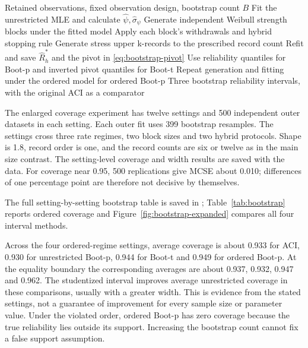 \begin{algorithm}[htbp]
\caption{Parametric bootstrap intervals for one retained dataset}\label{alg:bootstrap}
\begin{algorithmic}[1]
\REQUIRE Retained observations, fixed observation design, bootstrap count $B$
\STATE Fit the unrestricted MLE and calculate $\widehat\psi,\widehat\sigma_\psi$
\STATE Generate independent Weibull strength blocks under the fitted model
\STATE Apply each block's withdrawals and hybrid stopping rule
\STATE Generate stress upper k-records to the prescribed record count
\STATE Refit and save $\widehat R_h^*$ and the pivot in \eqref{eq:bootstrap-pivot}
\ENDFOR
\STATE Use reliability quantiles for Boot-p and inverted pivot quantiles for Boot-t
\STATE Repeat generation and fitting under the ordered model for ordered Boot-p
\ENSURE Three bootstrap reliability intervals, with the original ACI as a comparator
\end{algorithmic}
\end{algorithm}

The enlarged coverage experiment has twelve settings and 500 independent outer datasets in each setting. Each outer fit uses 399 bootstrap resamples. The settings cross three rate regimes, two block sizes and two hybrid protocols. Shape is 1.8, record order is one, and the record counts are six or twelve as in the main size contrast. The setting-level coverage and width results are saved with the data. For coverage near 0.95, 500 replications give MCSE about 0.010; differences of one percentage point are therefore not decisive by themselves.

The full setting-by-setting bootstrap table is saved in ; Table~\ref{tab:bootstrap} reports ordered coverage and Figure~\ref{fig:bootstrap-expanded} compares all four interval methods.

Across the four ordered-regime settings, average coverage is about 0.933 for ACI, 0.930 for unrestricted Boot-p, 0.944 for Boot-t and 0.949 for ordered Boot-p. At the equality boundary the corresponding averages are about 0.937, 0.932, 0.947 and 0.962. The studentized interval improves average unrestricted coverage in these comparisons, usually with a greater width. This is evidence from the stated settings, not a guarantee of improvement for every sample size or parameter value. Under the violated order, ordered Boot-p has zero coverage because the true reliability lies outside its support. Increasing the bootstrap count cannot fix a false support assumption.

